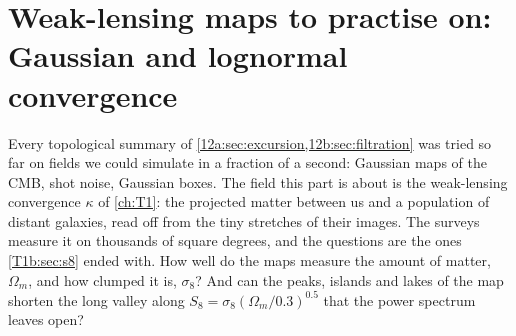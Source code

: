 \providecommand{\WLcrossDES}{}\renewcommand{\WLcrossDES}{266}
\providecommand{\WThcrossDES}{}\renewcommand{\WThcrossDES}{12.9}
\providecommand{\WLcrossKiDS}{}\renewcommand{\WLcrossKiDS}{286}
\providecommand{\WThcrossKiDS}{}\renewcommand{\WThcrossKiDS}{12.0}
\providecommand{\WLcrossSfour}{}\renewcommand{\WLcrossSfour}{1064}
\providecommand{\WThcrossSfour}{}\renewcommand{\WThcrossSfour}{3.2}
\providecommand{\WCovRatioLNmax}{}\renewcommand{\WCovRatioLNmax}{1.04}
\providecommand{\WCovRatioLNmin}{}\renewcommand{\WCovRatioLNmin}{0.98}
\providecommand{\WCovRatioGmax}{}\renewcommand{\WCovRatioGmax}{1.03}
\providecommand{\WCovRatioGmin}{}\renewcommand{\WCovRatioGmin}{0.93}
\providecommand{\WCovRatioErrLN}{}\renewcommand{\WCovRatioErrLN}{0.045}
\providecommand{\WCovRatioErrG}{}\renewcommand{\WCovRatioErrG}{0.058}
\providecommand{\WCorrLNmax}{}\renewcommand{\WCorrLNmax}{0.08}
\providecommand{\WCorrGmax}{}\renewcommand{\WCorrGmax}{0.11}
\providecommand{\WCorrLNmean}{}\renewcommand{\WCorrLNmean}{-0.00}
\providecommand{\WCorrGmean}{}\renewcommand{\WCorrGmean}{0.011}
\providecommand{\WModesLow}{}\renewcommand{\WModesLow}{28}
\providecommand{\WModesHigh}{}\renewcommand{\WModesHigh}{15208}
\providecommand{\WCostBase}{}\renewcommand{\WCostBase}{0.0218}
\providecommand{\WCostBaseOm}{}\renewcommand{\WCostBaseOm}{0.097}
\providecommand{\WCostLow}{}\renewcommand{\WCostLow}{0.0427}
\providecommand{\WCostLowOm}{}\renewcommand{\WCostLowOm}{0.230}
\providecommand{\WCostM}{}\renewcommand{\WCostM}{0.0245}
\providecommand{\WCostMOm}{}\renewcommand{\WCostMOm}{0.097}
\providecommand{\WCostLowM}{}\renewcommand{\WCostLowM}{0.0438}
\providecommand{\WCostLowMOm}{}\renewcommand{\WCostLowMOm}{0.231}
\providecommand{\WCostDES}{}\renewcommand{\WCostDES}{0.0243}
\providecommand{\WCostDESOm}{}\renewcommand{\WCostDESOm}{0.121}
\providecommand{\WCostSfour}{}\renewcommand{\WCostSfour}{0.0095}
\providecommand{\WCostSfourOm}{}\renewcommand{\WCostSfourOm}{0.007}
\section{Weak-lensing maps to practise on: Gaussian and lognormal convergence}
\label{12w:sec:maps}

Every topological summary of \cref{12a:sec:excursion,12b:sec:filtration} was tried so far on fields we could
simulate in a fraction of a second: Gaussian maps of the CMB, shot noise, Gaussian boxes. The field this part is
about is the weak-lensing convergence $\kappa$ of \cref{ch:T1}: the projected matter between us and a population of
distant galaxies, read off from the tiny stretches of their images. The surveys measure it on thousands of square
degrees, and the questions are the ones \cref{T1b:sec:s8} ended with. How well do the maps measure the amount of
matter, $\Omega_m$, and how clumped it is, $\sigma_8$? And can the peaks, islands and lakes of the map shorten the
long valley along $S_8=\sigma_8(\Omega_m/0.3)^{0.5}$ that the power spectrum leaves open?

